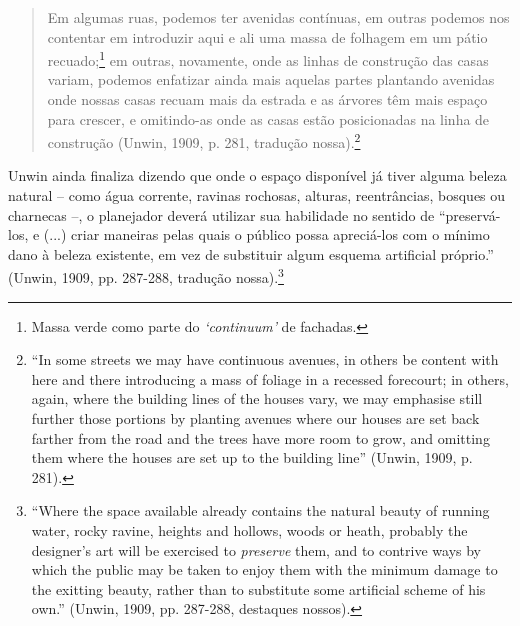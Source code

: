 \documentclass[12pt, a4paper]{book} %
\begin{document}
        \begin{quotation}
            Em algumas ruas, podemos ter avenidas contínuas, em outras podemos nos contentar em introduzir aqui e ali uma massa de folhagem em um pátio recuado;\footnote[96]{Massa verde como parte do \textit{`continuum'} de fachadas.} em outras, novamente, onde as linhas de construção das casas variam, podemos enfatizar ainda mais aquelas partes plantando avenidas onde nossas casas recuam mais da estrada e as árvores têm mais espaço para crescer, e omitindo-as onde as casas estão posicionadas na linha de construção (Unwin, 1909, p. 281, tradução nossa).\footnote[97]{``In some streets we may have continuous avenues, in others be content with here and there introducing a mass of foliage in a recessed forecourt; in others, again, where the building lines of the houses vary, we may emphasise still further those portions by planting avenues where our houses are set back farther from the road and the trees have more room to grow, and omitting them where the houses are set up to the building line'' (Unwin, 1909, p. 281).}
        \end{quotation}

        Unwin ainda finaliza dizendo que onde o espaço disponível já tiver alguma beleza natural – como água corrente, ravinas rochosas, alturas, reentrâncias, bosques ou charnecas –, o planejador deverá utilizar sua habilidade no sentido de ``preservá-los, e (...) criar maneiras pelas quais o público possa apreciá-los com o mínimo dano à beleza existente, em vez de substituir algum esquema artificial próprio.'' (Unwin, 1909, pp. 287-288, tradução nossa).\footnote[98]{``Where the space available already contains the natural beauty of running water, rocky ravine, heights and hollows, woods or heath, probably the designer's art will be exercised to \textit{preserve} them, and to contrive ways by which the public may be taken to enjoy them with the minimum damage to the exitting beauty, rather than to substitute some artificial scheme of his own.'' (Unwin, 1909, pp. 287-288, destaques nossos).}
\end{document}
